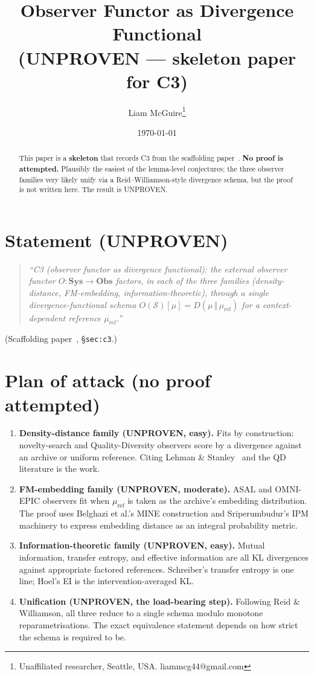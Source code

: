 \documentclass[11pt]{article}
\title{Observer Functor as Divergence Functional \\
       \large (UNPROVEN --- skeleton paper for C3)}
\author{Liam McGuire\thanks{Unaffiliated researcher, Seattle, USA. liammcg44@gmail.com}}
\date{\today}
\theoremstyle{plain}
\theoremstyle{definition}
\begin{document}
\maketitle

\begin{abstract}
This paper is a \textbf{skeleton} that records C3 from the scaffolding
paper~\cite{emergent_systems_2026}. \textbf{No proof is attempted.}
Plausibly the easiest of the lemma-level conjectures; the three
observer families very likely unify via a Reid--Williamson-style
divergence schema, but the proof is not written here.
The result is UNPROVEN.
\end{abstract}

\section{Statement (UNPROVEN)}

\begin{quote}
\emph{``C3 (observer functor as divergence functional): the external
observer functor $O : \mathbf{Sys} \to \mathbf{Obs}$ factors, in each
of the three families (density-distance, FM-embedding,
information-theoretic), through a single divergence-functional schema
$O(\mathcal{S})[\mu] = D(\mu \,\Vert\, \mu_{\mathrm{ref}})$ for a
context-dependent reference $\mu_{\mathrm{ref}}$.''}
\end{quote}
\noindent (Scaffolding paper~\cite{emergent_systems_2026},
\S\texttt{sec:c3}.)

\section{Plan of attack (no proof attempted)}

\begin{enumerate}[leftmargin=2em,itemsep=4pt]
  \item \textbf{Density-distance family (UNPROVEN, easy).} Fits by
    construction: novelty-search and Quality-Diversity observers
    score by a divergence against an archive or uniform reference.
    Citing Lehman \& Stanley~\cite{lehman2011novelty} and the QD
    literature is the work.
  \item \textbf{FM-embedding family (UNPROVEN, moderate).} ASAL and
    OMNI-EPIC observers fit when $\mu_{\mathrm{ref}}$ is taken as the
    archive's embedding distribution. The proof uses
    Belghazi et al.'s MINE construction and Sriperumbudur's IPM
    machinery to express embedding distance as an integral
    probability metric.
  \item \textbf{Information-theoretic family (UNPROVEN, easy).}
    Mutual information, transfer entropy, and effective information
    are all KL divergences against appropriate factored references.
    Schreiber's transfer entropy is one line; Hoel's EI is the
    intervention-averaged KL.
  \item \textbf{Unification (UNPROVEN, the load-bearing step).}
    Following Reid \& Williamson, all three reduce to a single
    schema modulo monotone reparametrisations. The exact equivalence
    statement depends on how strict the schema is required to be.
\end{enumerate}
\end{document}
